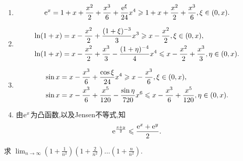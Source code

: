 \begin{solution}
    \begin{enumerate}
        \item $$\mathrm{e}^x = 1 + x + \frac{x^2}{2} + \frac{x^3}{6} + \frac{\mathrm{e}^\xi}{24} x^4 \geqslant 1 + x + \frac{x^2}{2} + \frac{x^3}{6}, \xi \in (0, x).$$
        \item \begin{align*}
            \ln(1+x) & = x - \frac{x^2}{2} + \frac{(1+\xi)^{-3}}{3} x^3 \geqslant x - \frac{x^2}{2}, \xi \in (0, x), \\
            \ln(1+x) & = x - \frac{x^2}{2} + \frac{x^3}{3} - \frac{(1+\eta)^{-4}}{4} x^4 \leqslant x - \frac{x^2}{2} + \frac{x^3}{3}, \eta \in (0, x).
        \end{align*}
        \item \begin{align*}
            \sin x & = x - \frac{x^3}{6} + \frac{\cos \xi}{24} x^4 \geqslant x - \frac{x^3}{6}, \xi \in (0, x), \\
            \sin x & = x - \frac{x^3}{6} + \frac{x^5}{120} - \frac{\sin \eta}{720} x^6 \leqslant x - \frac{x^3}{6} + \frac{x^5}{120}, \eta \in (0, x).
        \end{align*}
        \item 由$\mathrm{e}^x$为凸函数,以及Jensen不等式,知
              $$\mathrm{e}^{\frac{x+y}{2}} \leqslant \frac{\mathrm{e}^x + \mathrm{e}^y}{2}.$$
    \end{enumerate}
\end{solution}

\begin{exercise}[3.C.15]
    求 $\displaystyle \lim_{n \to \infty} \left(1 + \frac{1}{n^2}\right) \left(1 + \frac{2}{n^2}\right) \dots \left(1 + \frac{n}{n^2}\right)$.
\end{exercise}

